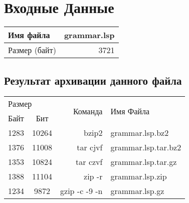 \documentclass{article}
\begin{document}
\section{Входные Данные}
\begin{table}[H]
\begin{tabular}{|l|r|}
\hline
    Имя файла & grammar.lsp\\\hline
    Размер (байт) & 3721\\\hline
\end{tabular}
\end{table}
\subsection{Результат архивации данного файла}
\begin{table}[H]
\begin{tabular}{|l|c|r|l|}
\hline
\multicolumn{2}{|l|}{Размер} & \multirow{2}{*}{Команда} & \multirow{2}{*}{Имя Файла} \\
\cline{1-2}
Байт  & Бит & & \\
\hline
1283 & 10264 & bzip2         & grammar.lsp.bz2\\
1376 & 11008 & tar cjvf      & grammar.lsp.tar.bz2\\
1353 & 10824 & tar czvf      & grammar.lsp.tar.gz\\
1388 & 11104 & zip -r        & grammar.lsp.zip\\
1234 & 9872  & gzip -c -9 -n & grammar.lsp.gz \\ \hline
\end{tabular}
\end{table}
\end{document}
